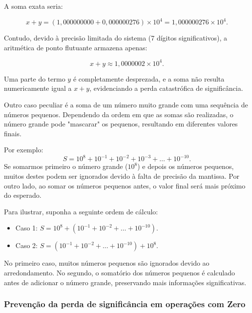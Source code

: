A soma exata seria:

\[
  x + y = (1{,}000000000 + 0{,}000000276) \times 10^4 = 1{,}000000276 \times 10^4.
\]

Contudo, devido à precisão limitada do sistema (7 dígitos significativos), a
aritmética de ponto flutuante armazena apenas:

\[
  x + y \approx 1{,}0000002 \times 10^4.
\]

Uma parte do termo \( y \) é completamente desprezada, e a soma não resulta
numericamente igual a \( x + y\), evidenciando a perda catastrófica de
significância.

Outro caso peculiar é a soma de um número muito grande com uma sequência de
números pequenos. Dependendo da ordem em que as somas são realizadas, o número
grande pode "mascarar" os pequenos, resultando em diferentes valores finais.

Por exemplo:
\[
  S = 10^{8} + 10^{-1} + 10^{-2} + 10^{-3} + \ldots + 10^{-10}.
\]
Se somarmos primeiro o número grande (\(10^8\)) e depois os números pequenos,
muitos destes podem ser ignorados devido à falta de precisão da mantissa. Por
outro lado, ao somar os números pequenos antes, o valor final será mais próximo
do esperado.

Para ilustrar, suponha a seguinte ordem de cálculo:
\begin{itemize}
  \item Caso 1: \(S = 10^{8} + (10^{-1} + 10^{-2} + \ldots + 10^{-10})\).
  \item Caso 2: \(S = (10^{-1} + 10^{-2} + \ldots + 10^{-10}) + 10^{8}\).
\end{itemize}
No primeiro caso, muitos números pequenos são ignorados devido ao arredondamento. No segundo, o somatório dos números pequenos é calculado antes de adicionar o número grande, preservando mais informações significativas.

\subsubsection*{Prevenção da perda de significância em operações com Zero}
\label{subsec:repZero}

